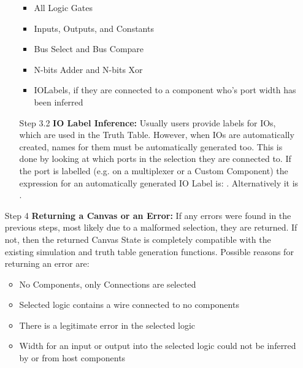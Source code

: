 \begin{itemize}
\begin{itemize}
        \begin{itemize}
            \item All Logic Gates
            \item Inputs, Outputs, and Constants
            \item Bus Select and Bus Compare
            \item N-bits Adder and N-bits Xor
            \item IOLabels, if they are connected to a component who's port width has been inferred
        \end{itemize}
        \item[Step 3.2] \textbf{IO Label Inference:} Usually users provide labels for IOs, which are used in the Truth Table. However, when IOs are automatically created, names for them must be automatically generated too. This is done by looking at which ports in the selection they are connected to. If the port is labelled (e.g. on a multiplexer or a Custom Component) the expression for an automatically generated IO Label is: . Alternatively it is .
    \end{itemize} 
    \item[Step 4] \textbf{Returning a Canvas or an Error:} If any errors were found in the previous steps, most likely due to a malformed selection, they are returned. If not, then the returned Canvas State is completely compatible with the existing simulation and truth table generation functions. Possible reasons for returning an error are:
    \begin{itemize}
        \item No Components, only Connections are selected
        \item Selected logic contains a wire connected to no components
        \item There is a legitimate error in the selected logic
        \item Width for an input or output into the selected logic could not be inferred by  or from host components
    \end{itemize}
\end{itemize}



